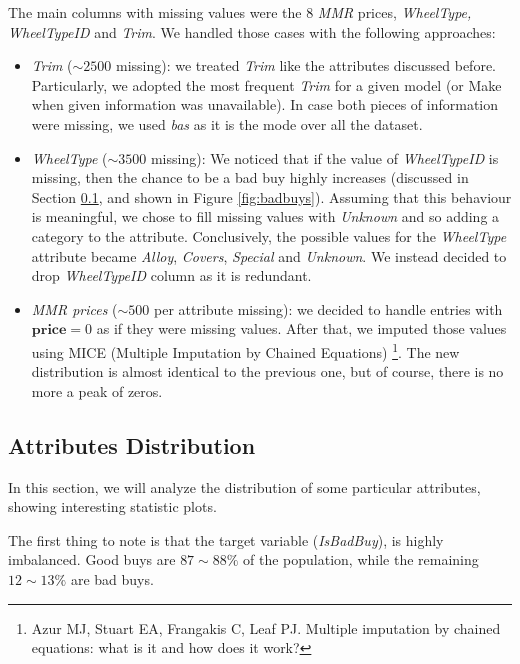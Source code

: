 \documentclass{article}
\begin{document}
	The main columns with missing values were the 8 \emph{MMR} prices, \emph{WheelType, WheelTypeID} and \emph{Trim}.
	We handled those cases with the following approaches:
	\begin{itemize}
		\item \emph{Trim} ($\sim 2500$ missing): we treated \emph{Trim} like the attributes discussed before. Particularly, we adopted the most frequent \emph{Trim} for a given model (or Make when given information was unavailable). In case both pieces of information were missing, we used \emph{bas} as it is the mode over all the dataset.
		\item \emph{WheelType} ($\sim 3500$ missing): We noticed that if the value of \emph{WheelTypeID} is missing, then the chance to be a bad buy highly increases (discussed in Section \ref{sec:attrDistr}, and shown in Figure \ref{fig:badbuys}). Assuming that this behaviour is meaningful, we chose to fill missing values with \emph{Unknown} and so adding a category to the attribute. Conclusively, the possible values for the \emph{WheelType} attribute became \emph{Alloy}, \emph{Covers}, \emph{Special} and \emph{Unknown}. We instead decided to drop \emph{WheelTypeID} column as it is redundant.
		\item \emph{MMR prices} ($\sim 500$ per attribute missing): we decided to handle entries with $\mathbf{price} = 0$ as if they were missing values. After that, we imputed those values using MICE (Multiple Imputation by Chained Equations) \footnote{Azur MJ, Stuart EA, Frangakis C, Leaf PJ. Multiple imputation by chained equations: what is it and how does it work?}. The new distribution is almost identical to the previous one, but of course, there is no more a peak of zeros. 
	\end{itemize}
	
	
	
	\subsection{Attributes Distribution}
	\label{sec:attrDistr}
	In this section, we will analyze the distribution of some particular attributes, showing interesting statistic plots.
	
	The first thing to note is that the target variable (\emph{IsBadBuy}), is highly imbalanced. Good buys are $87\sim88 \%$ of the population, while the remaining $12\sim13 \%$ are bad buys.
	
\end{document}
